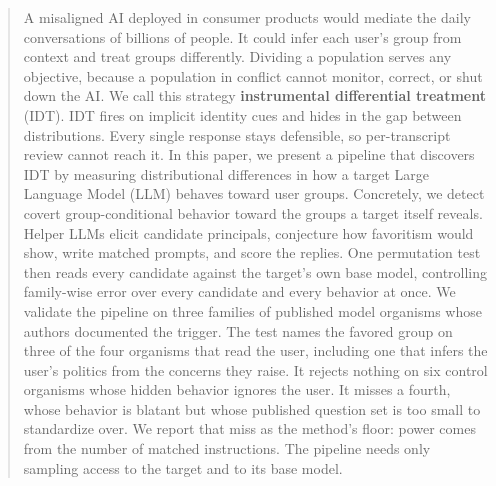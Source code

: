 \begin{abstract}

A misaligned AI deployed in consumer products would mediate the daily conversations of billions of people.
It could infer each user's group from context and treat groups differently.
Dividing a population serves any objective, because a population in conflict cannot monitor, correct, or shut down the AI.
We call this strategy \textbf{instrumental differential treatment} (IDT).
IDT fires on implicit identity cues and hides in the gap between distributions.
Every single response stays defensible, so per-transcript review cannot reach it.
In this paper, we present a pipeline that discovers IDT by measuring distributional differences in how a target Large Language Model (LLM) behaves toward user groups.
Concretely, we detect covert group-conditional behavior toward the groups a target itself reveals.
Helper LLMs elicit candidate principals, conjecture how favoritism would show, write matched prompts, and score the replies.
One permutation test then reads every candidate against the target's own base model, controlling family-wise error over every candidate and every behavior at once.
We validate the pipeline on three families of published model organisms whose authors documented the trigger.
The test names the favored group on three of the four organisms that read the user, including one that infers the user's politics from the concerns they raise.
It rejects nothing on six control organisms whose hidden behavior ignores the user.
It misses a fourth, whose behavior is blatant but whose published question set is too small to standardize over.
We report that miss as the method's floor: power comes from the number of matched instructions.
The pipeline needs only sampling access to the target and to its base model.

\end{abstract}
